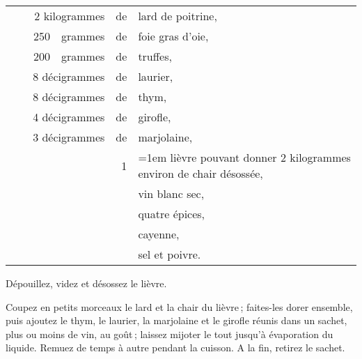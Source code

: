 \footnotesize
\begin{longtable}{rrrrrp{18em}}
  & \multicolumn{3}{r}{2 kilogrammes}  & de & lard de poitrine,                                           \\
  & \hspace{2em} &  250 & grammes & de & foie gras d'oie,                                                 \\
  & \hspace{2em} &  200 & grammes & de & truffes,                                                         \\
  & \multicolumn{3}{r}{8 décigrammes}  & de & laurier,                                                    \\
  & \multicolumn{3}{r}{8 décigrammes}  & de & thym,                                                       \\
  & \multicolumn{3}{r}{4 décigrammes}  & de & girofle,                                                    \\
  & \multicolumn{3}{r}{3 décigrammes}  & de & marjolaine,                                                 \\
  & \hspace{2em} &      &         &  1 & \hangindent=1em lièvre pouvant donner 2 kilogrammes
                                                         environ de chair désossée,                       \\
  & \hspace{2em} &      &         &    & vin blanc sec,                                                   \\
  & \hspace{2em} &      &         &    & quatre épices,                                                   \\
  & \hspace{2em} &      &         &    & cayenne,                                                         \\
  & \hspace{2em} &      &         &    & sel et poivre.                                                   \\
\end{longtable}
\normalsize

Dépouillez, videz et désossez le lièvre.

Coupez en petits morceaux le lard et la chair du lièvre ; faites-les dorer
ensemble, puis ajoutez le thym, le laurier, la marjolaine et le girofle réunis
dans un sachet, plus ou moins de vin, au goût ; laissez mijoter le tout jusqu'à
évaporation du liquide. Remuez de temps à autre pendant la cuisson. A la fin,
retirez le sachet.


